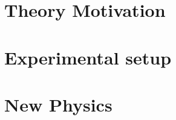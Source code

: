 \documentclass[a4paper,11pt,oneside]{memoir}
\begin{document}
\makeatletter
\renewcommand{\counterwithin}{\@ifstar{\@csinstar}{\@csin}}
\makeatother



\pagestyle{custom}%

\begingroup
    \frontmatter
    \clearpage
    \clearpage %
    \clearpage %
    \clearpage %
    \clearpage %
\endgroup



\begingroup
    \newpage
    
\endgroup




\mainmatter
{}









\part{Theory Motivation}


\FloatBarrier

\part{Experimental setup}




\FloatBarrier


\part{New Physics}








\end{document}
